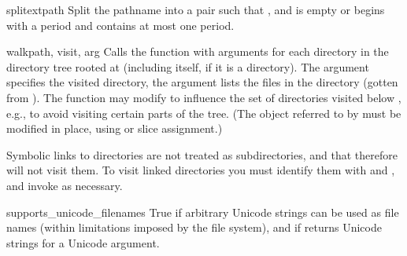\begin{funcdesc}{splitext}{path}
Split the pathname  into a pair  
such that ,
and  is empty or begins with a period and contains
at most one period.
\end{funcdesc}

\begin{funcdesc}{walk}{path, visit, arg}
Calls the function  with arguments
 for each directory in the
directory tree rooted at  (including  itself, if it
is a directory).  The argument  specifies the visited
directory, the argument  lists the files in the directory
(gotten from ).
The  function may modify  to
influence the set of directories visited below , e.g., to
avoid visiting certain parts of the tree.  (The object referred to by
 must be modified in place, using  or slice
assignment.)

\begin{notice}
Symbolic links to directories are not treated as subdirectories, and
that  therefore will not visit them. To visit linked
directories you must identify them with
 and
, and invoke  as
necessary.
\end{notice}

\begin{seealso}
\end{seealso}

\end{funcdesc}

\begin{datadesc}{supports_unicode_filenames}
True if arbitrary Unicode strings can be used as file names (within
limitations imposed by the file system), and if
 returns Unicode strings for a Unicode
argument.
\end{datadesc}
